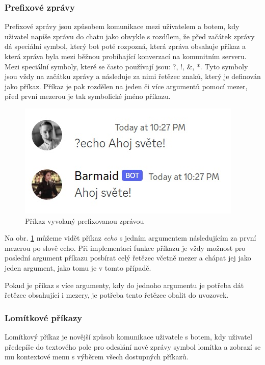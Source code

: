 \documentclass[
  program=inf,
biblatex=false,
sourcecodes=true,
joinlists=true,
  figures=true,
  tables=true,
  glossaries=true,
  index=false
]{kidiplom}
\begin{document}
\subsubsection{Prefixové zprávy}
Prefixové zprávy jsou způsobem komunikace mezi uživatelem a botem, kdy uživatel napíše zprávu do chatu
jako obvykle s rozdílem, že před začátek zprávy dá speciální symbol, který bot
poté rozpozná, která zpráva obsahuje příkaz a která zpráva byla mezi běžnou probíhající 
konverzací na komunitním serveru. Mezi speciální symboly, které se často používají jsou:
{?, !, \&, *}. Tyto symboly jsou vždy na začátku zprávy a následuje za nimi řetězec
znaků, který je definován jako příkaz. Příkaz je pak rozdělen na jeden či více argumentů
pomocí mezer, před první mezerou je tak symbolické jméno příkazu.

\begin{figure}[h]
  \centering \includegraphics[scale=1]{prefix}
  \caption{\label{prefix_command}Příkaz vyvolaný prefixovanou zprávou}
\end{figure}

Na obr. \ref{prefix_command} můžeme vidět příkaz {\it echo} s jedním argumentem následujícím 
za první mezerou po slově echo. Při implementaci funkce příkazu je vždy možnost pro
poslední argument příkazu posbírat celý řetězec včetně mezer a chápat jej jako jeden argument,
jako tomu je v tomto případě.

Pokud je příkaz s více argumenty, kdy do jednoho argumentu je potřeba dát řetězec 
obsahující i mezery, je potřeba tento řetězec obalit do uvozovek.

\subsubsection{Lomítkové příkazy}
Lomítkový příkaz je novější způsob komunikace uživatele s botem, kdy uživatel předepíše do textového
pole pro odeslání nové zprávy symbol lomítka a zobrazí se mu kontextové menu s výběrem
všech dostupných příkazů.
\end{document}
